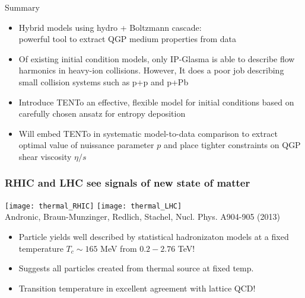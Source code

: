 \documentclass[svgnames]{beamer}
\newcommand{\trento}{T\raisebox{-.5ex}{R}ENTo}
\begin{document}
\begin{frame}{Summary}
\begin{itemize}
 \item Hybrid models using hydro + Boltzmann cascade: \\ powerful tool to extract QGP medium properties from data 
 \vspace{0.1 in}
 \item Of existing initial condition models, only IP-Glasma is able to describe flow harmonics in heavy-ion collisions. However,
       It does a poor job describing small collision systems such as p+p and p+Pb
 \vspace{0.1 in}
 \item Introduce {\trento} an effective, flexible model for initial conditions based on carefully chosen ansatz for entropy deposition
 \vspace{0.1 in}
 \item Will embed {\trento} in systematic model-to-data comparison to extract optimal value of nuissance parameter $p$ and
       place tighter constraints on QGP shear viscosity $\eta/s$
\end{itemize}
 
\end{frame}


\begin{frame}[noframenumbering]
 \frametitle{RHIC and LHC see signals of new state of matter}
 \centering
 \texttt{[image: thermal\_RHIC]}
 \hspace{0.05 in}
 \texttt{[image: thermal\_LHC]}\\
 \vspace{-0.1 in}
 \scriptsize Andronic, Braun-Munzinger, Redlich, Stachel, Nucl. Phys. A904-905 (2013)
 \normalsize \vspace{0.1 in}
 \begin{itemize}
  \item Particle yields well described by statistical hadronizaton models at a fixed temperature $T_c \sim 165$ MeV from $0.2-2.76$ TeV!
  \item Suggests all particles created from thermal source at fixed temp.
  \item Transition temperature in excellent agreement with lattice QCD!
 \end{itemize}
 
\end{frame}
\end{document}

